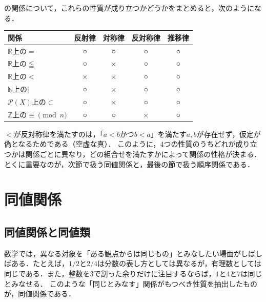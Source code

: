 の関係について，これらの性質が成り立つかどうかをまとめると，次のようになる．

\begin{center}
  \begin{tabular}{|l|c|c|c|c|} \hline
    \textbf{関係}                      & \textbf{反射律} & \textbf{対称律} & \textbf{反対称律} & \textbf{推移律} \\ \hline
    $\mathbb{R}$上の$=$               & ○      & ○      & ○        & ○      \\ \hline
    $\mathbb{R}$上の$\leqq$           & ○      & ×      & ○        & ○      \\ \hline
    $\mathbb{R}$上の$<$               & ×      & ×      & ○        & ○      \\ \hline
    $\mathbb{N}$上の$\mid$            & ○      & ×      & ○        & ○      \\ \hline
    $\mathcal{P}(X)$上の$\subset$     & ○      & ×\footnotemark & ○        & ○      \\ \hline
    $\mathbb{Z}$上の$\equiv \pmod{n}$ & ○      & ○      & ×\footnotemark & ○      \\ \hline
  \end{tabular}
\end{center}
\addtocounter{footnote}{-1}

$<$が反対称律を満たすのは，「$a < b$かつ$b < a$」を満たす$a,b$が存在せず，仮定が偽となるためである（空虚な真）．
このように，$4$つの性質のうちどれが成り立つかは関係ごとに異なり，どの組合せを満たすかによって関係の性格が決まる．とくに重要なのが，次節で扱う同値関係と，最後の節で扱う順序関係である．

\section{同値関係}

\subsection{同値関係と同値類}

数学では，異なる対象を「ある観点からは同じもの」とみなしたい場面がしばしばある．たとえば，$1/2$と$2/4$は分数の表し方としては異なるが，有理数としては同じである．また，整数を$3$で割った余りだけに注目するならば，$1$と$4$と$7$は同じとみなせる．
このような「同じとみなす」関係がもつべき性質を抽出したものが，同値関係である．

